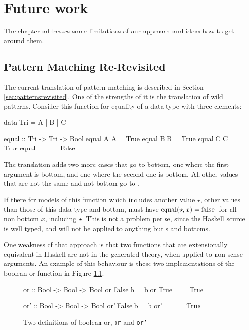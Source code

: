 \chapter{Future work}
\label{ch:future}

The chapter addresses some limitations of our approach and ideas how
to get around them.

\section{Pattern Matching Re-Revisited}

The current translation of pattern matching is described in Section
\ref{sec:patternsrevisited}. One of the strengths of it is the
translation of wild patterns. Consider this function for equality of a
data type with three elements:

\begin{code}
data Tri = A | B | C

equal :: Tri -> Tri -> Bool
equal A A = True
equal B B = True
equal C C = True
equal _ _ = False
\end{code}

\noindent
The translation adds two more cases that go to bottom, one where the
first argument is bottom, and one where the second one is bottom. All
other values that are not the same  and not bottom go to
.

If there for models of this function which includes
another value $\star$, other values than those of this data type and
bottom, must have $\mathrm{equal}(\star,x) = \mathrm{false}$, for all non
bottom $x$, including $\star$. This is not a problem per se, since the
Haskell source is well typed, and  will not be applied to
anything but s and bottoms.

One weakness of that approach is that two functions that are
extensionally equivalent in Haskell are not in the generated theory,
when applied to non sense arguments. An example of this behaviour is
these two implementations of the boolean or function in Figure
\ref{code:or}.

\begin{figure}[h!]
\centering
\begin{minipage}[b]{6cm}
\begin{code}
or :: Bool -> Bool -> Bool
or False b = b
or True  _ = True
\end{code}
\end{minipage}
\hspace{10pt}
\begin{minipage}[b]{6cm}
\begin{code}
or' :: Bool -> Bool -> Bool
or' False b = b
or' _     _ = True
\end{code}
\end{minipage}
\caption{Two definitions of boolean or, \texttt{or} and \texttt{or'}
\label{code:or}
}
\end{figure}

